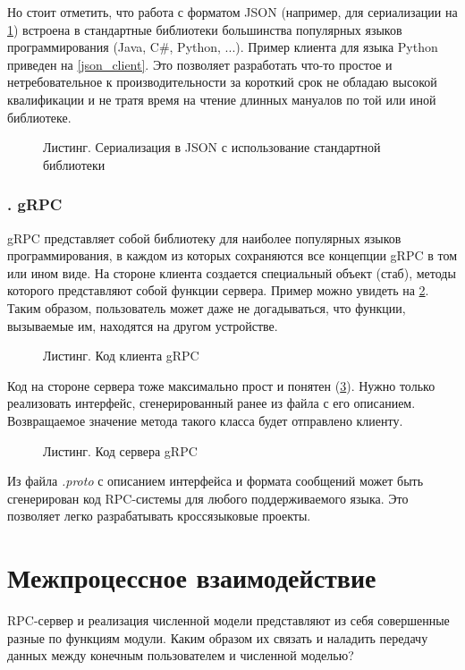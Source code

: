 \documentclass[a4paper,14pt,indentfirst]{extreport}
\begin{document}
Но стоит отметить, что работа с форматом JSON (например, для сериализации на \cref{json_ser}) встроена в стандартные библиотеки большинства популярных языков программирования (Java, C\#, Python, ...). Пример клиента для языка Python приведен на \cref{json_client}. Это позволяет разработать что-то простое и нетребовательное к производительности за короткий срок не обладаю высокой квалификации и не тратя время на чтение длинных мануалов по той или иной библиотеке.
\begin{figure}[h]
  
  \caption{Листинг. Сериализация в JSON с использование стандартной библиотеки}
  \label{json_ser}
\end{figure}
\FloatBarrier
{}
\subsubsection*{\thesubsubsection. gRPC}
gRPC представляет собой библиотеку для наиболее популярных языков программирования, в каждом из которых сохраняются все концепции gRPC в том или ином виде. На стороне клиента создается специальный объект (стаб), методы которого представляют собой функции сервера. Пример можно увидеть на \cref{grpc_client}. Таким образом, пользователь может даже не догадываться, что функции, вызываемые им, находятся на другом устройстве.
\begin{figure}[h]
  
  \caption{Листинг. Код клиента gRPC}
  \label{grpc_client}
\end{figure}

\FloatBarrier
Код на стороне сервера тоже максимально прост и понятен (\cref{grpc_server}). Нужно только реализовать интерфейс, сгенерированный ранее из файла с его описанием. Возвращаемое значение метода такого класса будет отправлено клиенту.
\begin{figure}[h]
  
  \caption{Листинг. Код сервера gRPC}
  \label{grpc_server}
\end{figure}

Из файла \textit{.proto} с описанием интерфейса и формата сообщений может быть сгенерирован код RPC-системы для любого поддерживаемого языка. Это позволяет легко разрабатывать кроссязыковые проекты.
\FloatBarrier
\section{Межпроцессное взаимодействие}
RPC-сервер и реализация численной модели представляют из себя совершенные разные по функциям модули. Каким образом их связать и наладить передачу данных между конечным пользователем и численной моделью?
\end{document}
